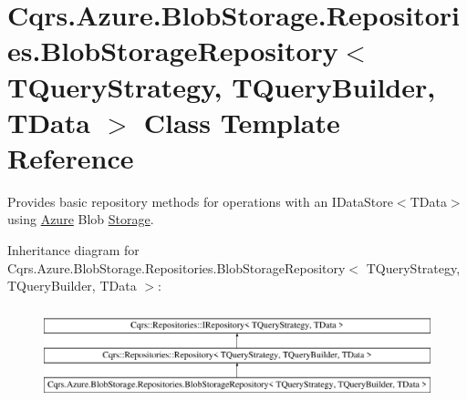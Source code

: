 \hypertarget{classCqrs_1_1Azure_1_1BlobStorage_1_1Repositories_1_1BlobStorageRepository}{}\section{Cqrs.\+Azure.\+Blob\+Storage.\+Repositories.\+Blob\+Storage\+Repository$<$ T\+Query\+Strategy, T\+Query\+Builder, T\+Data $>$ Class Template Reference}
\label{classCqrs_1_1Azure_1_1BlobStorage_1_1Repositories_1_1BlobStorageRepository}


Provides basic repository methods for operations with an I\+Data\+Store$<$\+T\+Data$>$ using \hyperlink{namespaceCqrs_1_1Azure}{Azure} Blob \hyperlink{namespaceCqrs_1_1Azure_1_1Storage}{Storage}.  


Inheritance diagram for Cqrs.\+Azure.\+Blob\+Storage.\+Repositories.\+Blob\+Storage\+Repository$<$ T\+Query\+Strategy, T\+Query\+Builder, T\+Data $>$\+:\begin{figure}[H]
\begin{center}
\leavevmode
\includegraphics[height=2.749591cm]{classCqrs_1_1Azure_1_1BlobStorage_1_1Repositories_1_1BlobStorageRepository}
\end{center}
\end{figure}
